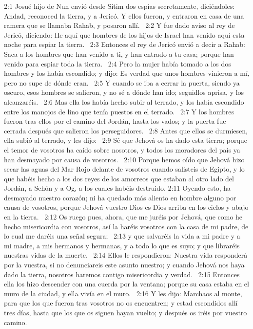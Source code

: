 2:1 Josué hijo de Nun envió desde Sitim dos espías secretamente, diciéndoles: Andad, reconoced la tierra, y a Jericó. Y ellos fueron, y entraron en casa de una ramera que se llamaba Rahab, y posaron allí.  
2:2 Y fue dado aviso al rey de Jericó, diciendo: He aquí que hombres de los hijos de Israel han venido aquí esta noche para espiar la tierra.  
2:3 Entonces el rey de Jericó envió a decir a Rahab: Saca a los hombres que han venido a ti, y han entrado a tu casa; porque han venido para espiar toda la tierra.  
2:4 Pero la mujer había tomado a los dos hombres y los había escondido; y dijo: Es verdad que unos hombres vinieron a mí, pero no supe de dónde eran.  
2:5 Y cuando se iba a cerrar la puerta, siendo ya oscuro, esos hombres se salieron, y no sé a dónde han ido; seguidlos aprisa, y los alcanzaréis.  
2:6 Mas ella los había hecho subir al terrado, y los había escondido entre los manojos de lino que tenía puestos en el terrado.  
2:7 Y los hombres fueron tras ellos por el camino del Jordán, hasta los vados; y la puerta fue cerrada después que salieron los perseguidores.  
2:8 Antes que ellos se durmiesen, ella subió al terrado, y les dijo:  
2:9 Sé que Jehová os ha dado esta tierra; porque el temor de vosotros ha caído sobre nosotros, y todos los moradores del país ya han desmayado por causa de vosotros.  
2:10 Porque hemos oído que Jehová hizo secar las aguas del Mar Rojo delante de vosotros cuando salisteis de Egipto, y lo que habéis hecho a los dos reyes de los amorreos que estaban al otro lado del Jordán, a Sehón y a Og, a los cuales habéis destruido. 
2:11 Oyendo esto, ha desmayado nuestro corazón; ni ha quedado más aliento en hombre alguno por causa de vosotros, porque Jehová vuestro Dios es Dios arriba en los cielos y abajo en la tierra.  
2:12 Os ruego pues, ahora, que me juréis por Jehová, que como he hecho misericordia con vosotros, así la haréis vosotros con la casa de mi padre, de lo cual me daréis una señal segura;  
2:13 y que salvaréis la vida a mi padre y a mi madre, a mis hermanos y hermanas, y a todo lo que es suyo; y que libraréis nuestras vidas de la muerte.  
2:14 Ellos le respondieron: Nuestra vida responderá por la vuestra, si no denunciareis este asunto nuestro; y cuando Jehová nos haya dado la tierra, nosotros haremos contigo misericordia y verdad.  
2:15 Entonces ella los hizo descender con una cuerda por la ventana; porque su casa estaba en el muro de la ciudad, y ella vivía en el muro.  
2:16 Y les dijo: Marchaos al monte, para que los que fueron tras vosotros no os encuentren; y estad escondidos allí tres días, hasta que los que os siguen hayan vuelto; y después os iréis por vuestro camino.  
